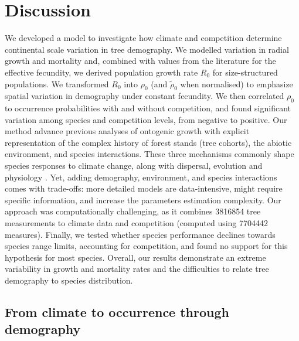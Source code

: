 

\section{Discussion}
We developed a model to investigate how climate and competition determine continental scale variation in tree demography. We modelled variation in radial growth and mortality and, combined with values from the literature for the effective fecundity, we derived population growth rate $ R_0 $ for size-structured populations. We transformed $ R_0 $ into $ \rho_0 $ (and $ \tilde \rho_0 $ when normalised) to emphasize spatial variation in demography under constant fecundity. We then correlated $ \rho_0 $ to occurrence probabilities with and without competition, and found significant variation among species and competition levels, from negative to positive. Our method advance previous analyses of ontogenic growth \citep{McGill2012, Thuiller2014} with explicit representation of the complex history of forest stands (\ie tree cohorts), the abiotic environment, and species interactions. These three mechanisms commonly shape species responses to climate change, along with dispersal, evolution and physiology \citep{Urban2016}. Yet, adding demography, environment, and species interactions comes with trade-offs: more detailed models are data-intensive, might require specific information, and increase the parameters estimation complexity. Our approach was computationally challenging, as it combines \num{3816854} tree measurements to climate data and competition (computed using \num{7704442} measures). Finally, we tested whether species performance declines towards species range limits, accounting for competition, and found no support for this hypothesis for most species. Overall, our results demonstrate an extreme variability in growth and mortality rates and the difficulties to relate tree demography to species distribution.

\subsection{From climate to occurrence through demography}
